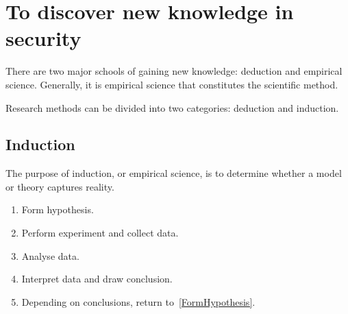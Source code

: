 


\section[Knowledge formation]{To discover new knowledge in security}


There are two major schools of gaining new knowledge: deduction and empirical 
science.
Generally, it is empirical science that constitutes the scientific method.

Research methods can be divided into two categories: deduction and induction.

\subsection{Induction}

The purpose of induction, or empirical science, is to determine whether a model 
or theory captures reality.

\begin{frame}
  \begin{definition}
    \begin{enumerate}
      \item\label{FormHypothesis} Form hypothesis.
      \item Perform experiment and collect data.
      \item Analyse data.
      \item Interpret data and draw conclusion.
      \item Depending on conclusions, return to~\ref{FormHypothesis}.
    \end{enumerate}
  \end{definition}
\end{frame}

